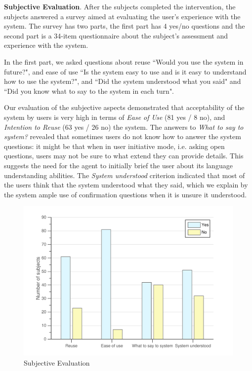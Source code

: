 \documentclass[letterpaper]{article}
\begin{document}
{\bf Subjective Evaluation}. After the subjects completed the intervention, the subjects answered a survey aimed at evaluating the user's experience with the system. The survey has two parts, the first part has 4 yes/no questions and the second part is a 34-item questionnaire about the subject's assessment and experience with the system. 

In the first part, we asked questions about reuse ``Would you use the system in future?", and ease of use ``Is the system easy to use and is it easy to understand how to use the system?", and ``Did the system understood what you said" and ``Did you know what to say to the system in each turn".

Our evaluation of the subjective aspects  
demonstrated that acceptability of the system by users is very high in terms of {\em Ease of Use} (81 yes / 8 no), and {\em Intention to Reuse} (63 yes / 26 no)
the system. The answers to {\em What to say to system?} revealed that sometimes users do not know how to answer the system questions: it might be that when in user initiative mode, i.e. asking open questions, users may not be sure to what extend they can provide details. This suggests the need for the agent to initially brief the user about its language understanding abilities.
The {\em System understood} criterion indicated that most of the users think that the system understood what they said, which we explain by the system ample use of confirmation questions when it is unsure it understood. 

\begin{figure}
 \centering
 \includegraphics[width=\columnwidth]{figures/subjective.pdf}
 \caption{Subjective Evaluation}
 \label{yesNoEva}
 \end{figure}
 
\end{document}
